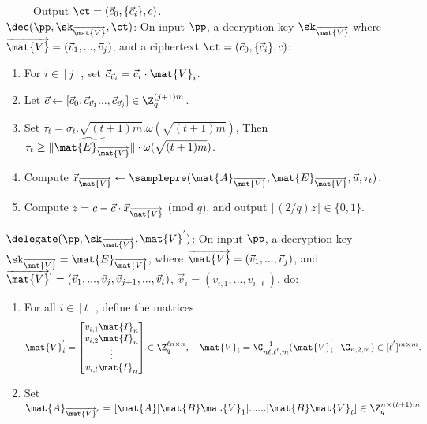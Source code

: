 \documentclass[11pt,hidelinks]{article}
\begin{document}
\begin{appendix}
\begin{enumerate}
\end{enumerate}
~~~~~Output $\ct=(\vec{c}_{0}, \{\vec{c}_{i}\}, c)$.\\[0.4cm]
$\dec(\pp, \sk_{\overrightarrow{\mat{V}}}, \ct)$: On input $\pp$, a decryption key $\sk_{\overrightarrow{\mat{V}}}$ where $\overrightarrow{\mat{V}}=(\vec{v}_{1},...,\vec{v}_{j})$, and a ciphertext $\ct=(\vec{c}_{0}, \{\vec{c}_{i}\}, c)$:
\begin{enumerate}
\item For $i \in [j]$, set $\vec{c}_{\vec{v}_{i}}=\vec{c}_{i}\cdot \mat{V}_{i}$.
\item Let $\vec{c} \leftarrow [\vec{c}_{0},\vec{c}_{\vec{v}_{1}}...,\vec{c}_{\vec{v}_{j}}] \in \Z^{(j+1)m}_{q}$.
\item Set $\tau_{t}=\sigma_{t}.\sqrt{(t+1)m}.\omega(\sqrt{(t+1)m})$, Then $\tau_{t}\geq \| \widetilde{\mat{E}_{\overrightarrow{\mat{V}}}} \|\cdot \omega(\sqrt{(t+1)m})$.
\item Compute $\vec{x}_{\overrightarrow{\mat{V}}} \leftarrow \samplepre(\mat{A}_{\overrightarrow{\mat{V}}}, \mat{E}_{\overrightarrow{\mat{V}}}, \vec{u}, \tau_{t})$.
\item Compute $z=c-\vec{c}\cdot \vec{x}_{\overrightarrow{\mat{V}}}$ (mod $q$), and output $\lfloor (2/q)z \rceil \in \{0,1\}$.
\end{enumerate}
$\delegate(\pp, \sk_{\overrightarrow{\mat{V}}}, \mat{V}^{'})$: On input $\pp$, a decryption key $\sk_{\overrightarrow{\mat{V}}}=\mat{E}_{\overrightarrow{\mat{V}}}$, where $\overrightarrow{\mat{V}}=(\vec{v}_{1},...,\vec{v}_{j})$, and $\overrightarrow{\mat{V}}^{'}=(\vec{v}_{1},...,\vec{v}_{j},\vec{v}_{j+1},...,\vec{v}_{t})$, $\vec{v}_{i}=(v_{i,1},...,v_{i,\ell})$. do:
\begin{enumerate}
\item For all $i \in [t]$, define the matrices
\begin{equation}
 \mat{V}^{'}_{i}= \begin{bmatrix}
v_{i,1} \mat{I}_{n}\\
v_{i,2} \mat{I}_{n}\\
\vdots\\
v_{i,l} \mat{I}_{n}
\end{bmatrix} \in \Z^{\ell n \times n}_{q},~~~ \mat{V}_{i}=\G^{-1}_{n\ell,\ell^{'},m}(\mat{V}^{'}_{i}\cdot \G_{n,2,m}) \in [\ell^{'}]^{m \times m}.
\end{equation}
\item Set $\mat{A}_{\overrightarrow{\mat{V}}^{'}}=[\mat{A} | \mat{B}\mat{V}_{1}| ...... | \mat{B}\mat{V}_{t}] \in \Z^{n \times (t+1)m}_{q}$

\end{enumerate}
\end{appendix}
\end{document}
